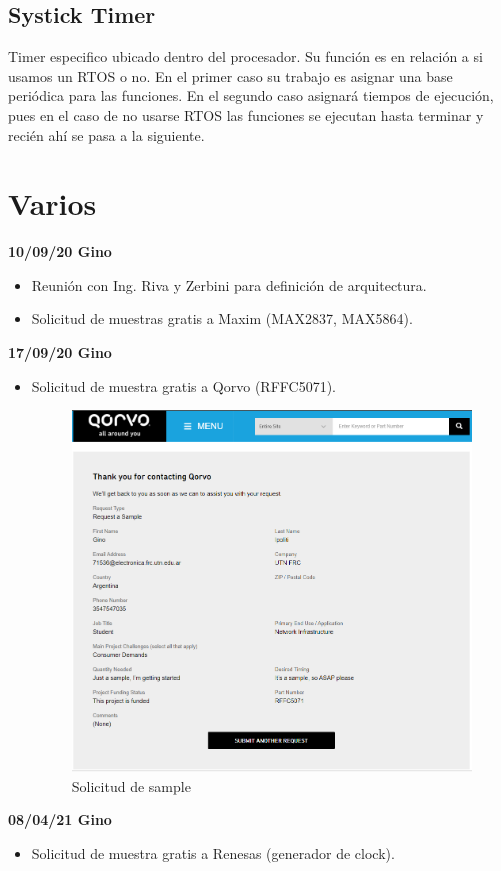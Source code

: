 \documentclass[a4paper,12pt]{report} %
\begin{document}
\section{Systick Timer}


Timer especifico ubicado dentro del procesador. Su función es en relación a si usamos un RTOS o no. En el primer caso su trabajo es asignar una base periódica para las funciones. En el segundo caso asignará tiempos de ejecución, pues en el caso de no usarse RTOS las funciones se ejecutan hasta terminar y recién ahí se pasa a la siguiente.
 


\chapter*{Varios}

\textbf{10/09/20 Gino}
\begin{itemize}
	\item Reunión con Ing. Riva y Zerbini para definición de arquitectura.
	\item Solicitud de muestras gratis a Maxim (MAX2837, MAX5864).
\end{itemize}
\textbf{17/09/20 Gino}
\begin{itemize}
	\item Solicitud de muestra gratis a Qorvo (RFFC5071).
	\begin{figure}[H]
		\centering
		\includegraphics[scale=0.6]{Imagenes/sample_qorvo}
		\caption{Solicitud de sample}
	\end{figure}
\end{itemize}
\textbf{08/04/21 Gino}
\begin{itemize}
	\item Solicitud de muestra gratis a Renesas (generador de clock).
\end{itemize}






	

\nocite{*}
\end{document}
